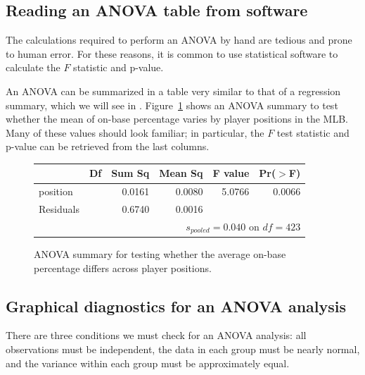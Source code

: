 \subsection{Reading an ANOVA table from software}

The calculations required to perform an ANOVA by hand are tedious and prone to human error. For these reasons, it is common to use statistical software to calculate the $F$ statistic and p-value.

An ANOVA can be summarized in a table very similar to that of a regression summary, which we will see in . Figure~\ref{anovaSummaryTableForOBPAgainstPosition} shows an ANOVA summary to test whether the mean of on-base percentage varies by player positions in the MLB. Many of these values should look familiar; in particular, the $F$ test statistic and p-value can be retrieved from the last columns.

\begin{figure}[ht]
\centering
\begin{tabular}{lrrrrr}
  \hline
  & Df & Sum Sq & Mean Sq & F value & Pr($>$F) \\ 
  \hline
  position & \mlbDFA{} & 0.0161 & 0.0080 & 5.0766 & 0.0066 \\ 
  Residuals & \mlbDFB{} & 0.6740 & 0.0016 &  &  \\ 

  \hline
\multicolumn{6}{r}{$s_{pooled} = 0.040$ on $df = 423$}
\end{tabular}
\caption{ANOVA summary for testing whether the average on-base percentage differs across player positions.}
\label{anovaSummaryTableForOBPAgainstPosition}
\end{figure}


\subsection{Graphical diagnostics for an ANOVA analysis}

There are three conditions we must check for an ANOVA analysis: all observations must be independent, the data in each group must be nearly normal, and the variance within each group must be approximately equal.

